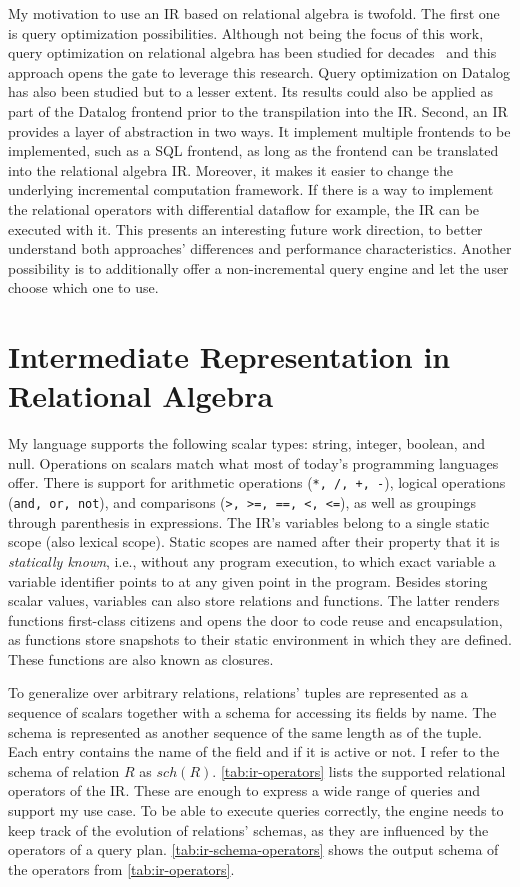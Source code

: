 My motivation to use an \ac{IR} based on relational algebra is twofold.
The first one is query optimization possibilities.
Although not being the focus of this work, query optimization on relational
algebra has been studied for decades~\cite{selinger1979access} and this approach
opens the gate to leverage this research.
Query optimization on Datalog has also been studied but to a lesser extent.
Its results could also be applied as part of the Datalog frontend prior to the
transpilation into the \ac{IR}.
Second, an \ac{IR} provides a layer of abstraction in two ways.
It implement multiple frontends to be implemented, such as a SQL frontend,
as long as the frontend can be translated into the relational algebra \ac{IR}.
Moreover, it makes it easier to change the underlying incremental computation
framework.
If there is a way to implement the relational operators with differential
dataflow for example, the \ac{IR} can be executed with it.
This presents an interesting future work direction, to better understand
both approaches' differences and performance characteristics.
Another possibility is to additionally offer a non-incremental query engine
and let the user choose which one to use.

\section{Intermediate Representation in Relational Algebra}\label{sec:ir}

My language supports the following scalar types: string, integer, boolean, and null.
Operations on scalars match what most of today's programming languages offer.
There is support for arithmetic operations (\texttt{*, /, +, -}),
logical operations (\texttt{and, or, not}),
and comparisons (\texttt{>, >=, ==, <, <=}),
as well as groupings through parenthesis in expressions.
The \ac{IR}'s variables belong to a single static scope (also lexical scope).
Static scopes are named after their property that it is \emph{statically known},
i.e., without any program execution, to which exact variable a
variable identifier points to at any given point in the program.
Besides storing scalar values, variables can also store relations and functions.
The latter renders functions first-class citizens and opens the door to
code reuse and encapsulation, as functions store snapshots to their static
environment in which they are defined.
These functions are also known as closures.

To generalize over arbitrary relations, relations' tuples are represented as
a sequence of scalars together with a schema for accessing its fields by name.
The schema is represented as another sequence of the same length as of the tuple.
Each entry contains the name of the field and if it is active or not.
I refer to the schema of relation \(R\) as \(\mathit{sch}(R)\).
\ref{tab:ir-operators} lists the supported relational operators of the \ac{IR}.
These are enough to express a wide range of queries and support my use case.
To be able to execute queries correctly, the engine needs to keep track of
the evolution of relations' schemas, as they are influenced by the operators
of a query plan.
\ref{tab:ir-schema-operators} shows the output schema of the operators from
\ref{tab:ir-operators}.

